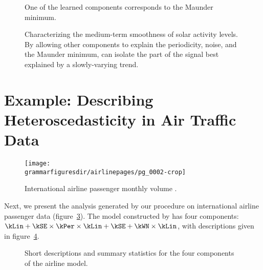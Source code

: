 \begin{figure}[ht!]
\centering
{}
\caption[A learned component corresponding to the Maunder minimum]
{One of the learned components corresponds to the Maunder minimum.}
\label{fig:maunder}
\end{figure}

\begin{figure}[ht!]
\centering
{}
\caption[\procedurename{} isolating the part of the signal explained by a slowly-varying trend]
{Characterizing the medium-term smoothness of solar activity levels.  By allowing other components to explain the periodicity, noise, and the Maunder minimum, \procedurename{} can isolate the part of the signal best explained by a slowly-varying trend.}
\label{fig:smooth}
\end{figure}



\section{Example: Describing Heteroscedasticity in Air Traffic Data}
\label{sec:airline}

\begin{figure}[ht!]
\centering
\texttt{[image: \\grammarfiguresdir/airlinepages/pg\_0002-crop]}
\caption[International airline passenger monthly volume dataset]
{International airline passenger monthly volume \citep[e.g.][]{box2013time}.}
\label{fig:airline}
\end{figure}

Next, we present the analysis generated by our procedure on international airline passenger data (figure~\ref{fig:airline}).
The model constructed by \procedurename{} has four components: $\kLin + \kSE \times \kPer \times \kLin + \kSE + \kWN \times \kLin$, with descriptions given in figure~\ref{fig:exec-airline}.

\begin{figure}[h]
\centering
{}
\caption[Short descriptions of the four components of the airline model]
{Short descriptions and summary statistics for the four components of the airline model.}
\label{fig:exec-airline}
\end{figure}


